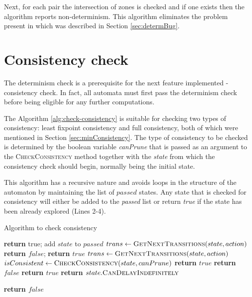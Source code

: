 Next, for each pair the intersection of zones is checked and if one exists then the algorithm reports non-determinism. This algorithm eliminates the problem present in  which was described in Section \ref{sec:determBug}.

\section{Consistency check}

The determinism check is a prerequisite for the next feature implemented - consistency check. In fact, all automata must first pass the determinism check before being eligible for any further computations.

The Algorithm \ref{alg:check-consistency} is suitable for checking two types of consistency: least fixpoint consistency and full consistency, both of which were mentioned in Section \ref{sec:minConsistency}. The type of consistency to be checked is determined by the boolean variable \textit{canPrune} that is passed as an argument to the \textsc{CheckConsistency} method together with the \textit{state} from which the consistency check should begin, normally being the initial state.

This algorithm has a recursive nature and avoids loops in the structure of the automaton by maintaining the list of $passed$ states. Any state that is checked for consistency will either be added to the \textit{passed} list or return \textit{true} if the state has been already explored (Lines 2-4). 

\begin{algorithm}
\caption{Algorithm to check consistency}
\label{alg:check-consistency}
\begin{algorithmic}[1]
\State \textbf{return} true;
\EndIf
\State add $state$ to $passed$
    \State $trans \gets \textsc{GetNextTransitions}(state, action)$
            \State \textbf{return $false$};
            \EndIf
        \EndFor
    \EndFor
    \State
    \State \textbf{return $true$}
    \EndIf
    \State
        \State $trans \gets \textsc{GetNextTransitions}(state, action)$
            \State $isConsistent \gets \textsc{CheckConsistency}(state, canPrune)$
            \State \textbf{return $true$}
            \EndIf
            \State \textbf{return $false$}
            \EndIf
        \EndFor
    \EndFor
    \State
        \State \textbf{return $true$}
        \Else
        \State \textbf{return} $state.\textsc{CanDelayIndefinitely}$
        \EndIf
    \EndIf
    
\State
\State \textbf{return $false$}	
\EndFunction
\end{algorithmic}
\end{algorithm}

